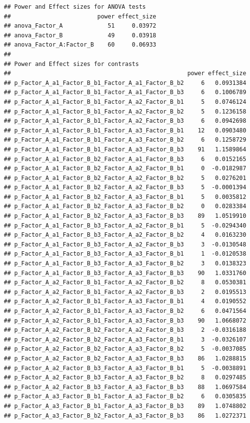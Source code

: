 \documentclass[]{book}
\begin{document}
\begin{verbatim}
## Power and Effect sizes for ANOVA tests
##                         power effect_size
## anova_Factor_A             51     0.03972
## anova_Factor_B             49     0.03918
## anova_Factor_A:Factor_B    60     0.06933
## 
## Power and Effect sizes for contrasts
##                                                   power effect_size
## p_Factor_A_a1_Factor_B_b1_Factor_A_a1_Factor_B_b2     6   0.0931384
## p_Factor_A_a1_Factor_B_b1_Factor_A_a1_Factor_B_b3     6   0.1006789
## p_Factor_A_a1_Factor_B_b1_Factor_A_a2_Factor_B_b1     5   0.0746124
## p_Factor_A_a1_Factor_B_b1_Factor_A_a2_Factor_B_b2     5   0.1236158
## p_Factor_A_a1_Factor_B_b1_Factor_A_a2_Factor_B_b3     6   0.0942698
## p_Factor_A_a1_Factor_B_b1_Factor_A_a3_Factor_B_b1    12   0.0903480
## p_Factor_A_a1_Factor_B_b1_Factor_A_a3_Factor_B_b2     6   0.1258729
## p_Factor_A_a1_Factor_B_b1_Factor_A_a3_Factor_B_b3    91   1.1589864
## p_Factor_A_a1_Factor_B_b2_Factor_A_a1_Factor_B_b3     6   0.0152165
## p_Factor_A_a1_Factor_B_b2_Factor_A_a2_Factor_B_b1     0  -0.0182987
## p_Factor_A_a1_Factor_B_b2_Factor_A_a2_Factor_B_b2     5   0.0276201
## p_Factor_A_a1_Factor_B_b2_Factor_A_a2_Factor_B_b3     5  -0.0001394
## p_Factor_A_a1_Factor_B_b2_Factor_A_a3_Factor_B_b1     5   0.0035812
## p_Factor_A_a1_Factor_B_b2_Factor_A_a3_Factor_B_b2     0   0.0283384
## p_Factor_A_a1_Factor_B_b2_Factor_A_a3_Factor_B_b3    89   1.0519910
## p_Factor_A_a1_Factor_B_b3_Factor_A_a2_Factor_B_b1     5  -0.0294340
## p_Factor_A_a1_Factor_B_b3_Factor_A_a2_Factor_B_b2     4   0.0163230
## p_Factor_A_a1_Factor_B_b3_Factor_A_a2_Factor_B_b3     3  -0.0130548
## p_Factor_A_a1_Factor_B_b3_Factor_A_a3_Factor_B_b1     1  -0.0120538
## p_Factor_A_a1_Factor_B_b3_Factor_A_a3_Factor_B_b2     3   0.0138323
## p_Factor_A_a1_Factor_B_b3_Factor_A_a3_Factor_B_b3    90   1.0331760
## p_Factor_A_a2_Factor_B_b1_Factor_A_a2_Factor_B_b2     8   0.0530381
## p_Factor_A_a2_Factor_B_b1_Factor_A_a2_Factor_B_b3     2   0.0195513
## p_Factor_A_a2_Factor_B_b1_Factor_A_a3_Factor_B_b1     4   0.0190552
## p_Factor_A_a2_Factor_B_b1_Factor_A_a3_Factor_B_b2     6   0.0471564
## p_Factor_A_a2_Factor_B_b1_Factor_A_a3_Factor_B_b3    90   1.0668072
## p_Factor_A_a2_Factor_B_b2_Factor_A_a2_Factor_B_b3     2  -0.0316188
## p_Factor_A_a2_Factor_B_b2_Factor_A_a3_Factor_B_b1     3  -0.0326107
## p_Factor_A_a2_Factor_B_b2_Factor_A_a3_Factor_B_b2     5  -0.0037085
## p_Factor_A_a2_Factor_B_b2_Factor_A_a3_Factor_B_b3    86   1.0288815
## p_Factor_A_a2_Factor_B_b3_Factor_A_a3_Factor_B_b1     5  -0.0038891
## p_Factor_A_a2_Factor_B_b3_Factor_A_a3_Factor_B_b2     8   0.0297485
## p_Factor_A_a2_Factor_B_b3_Factor_A_a3_Factor_B_b3    88   1.0697584
## p_Factor_A_a3_Factor_B_b1_Factor_A_a3_Factor_B_b2     6   0.0305835
## p_Factor_A_a3_Factor_B_b1_Factor_A_a3_Factor_B_b3    89   1.0748802
## p_Factor_A_a3_Factor_B_b2_Factor_A_a3_Factor_B_b3    86   1.0272371
\end{verbatim}
\end{document}
